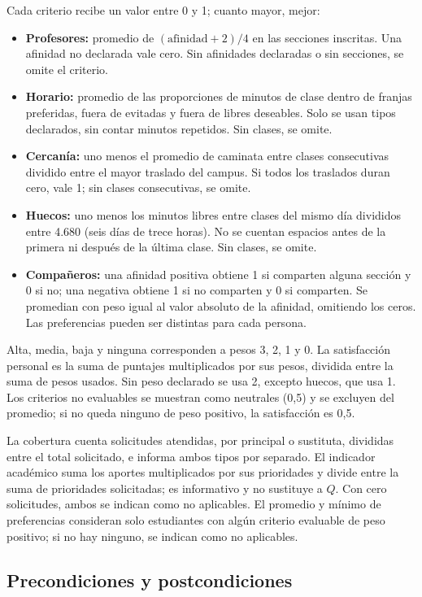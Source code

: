 Cada criterio recibe un valor entre 0 y 1; cuanto mayor, mejor:
\begin{itemize}
\item \textbf{Profesores:} promedio de $(\text{afinidad}+2)/4$ en las secciones inscritas. Una afinidad no declarada vale cero. Sin afinidades declaradas o sin secciones, se omite el criterio.
\item \textbf{Horario:} promedio de las proporciones de minutos de clase dentro de franjas preferidas, fuera de evitadas y fuera de libres deseables. Solo se usan tipos declarados, sin contar minutos repetidos. Sin clases, se omite.
\item \textbf{Cercanía:} uno menos el promedio de caminata entre clases consecutivas dividido entre el mayor traslado del campus. Si todos los traslados duran cero, vale 1; sin clases consecutivas, se omite.
\item \textbf{Huecos:} uno menos los minutos libres entre clases del mismo día divididos entre 4.680 (seis días de trece horas). No se cuentan espacios antes de la primera ni después de la última clase. Sin clases, se omite.
\item \textbf{Compañeros:} una afinidad positiva obtiene 1 si comparten alguna sección y 0 si no; una negativa obtiene 1 si no comparten y 0 si comparten. Se promedian con peso igual al valor absoluto de la afinidad, omitiendo los ceros. Las preferencias pueden ser distintas para cada persona.
\end{itemize}

Alta, media, baja y ninguna corresponden a pesos 3, 2, 1 y 0. La satisfacción personal es la suma de puntajes multiplicados por sus pesos, dividida entre la suma de pesos usados. Sin peso declarado se usa 2, excepto huecos, que usa 1. Los criterios no evaluables se muestran como neutrales (0,5) y se excluyen del promedio; si no queda ninguno de peso positivo, la satisfacción es 0,5.

La cobertura cuenta solicitudes atendidas, por principal o sustituta, divididas entre el total solicitado, e informa ambos tipos por separado. El indicador académico suma los aportes multiplicados por sus prioridades y divide entre la suma de prioridades solicitadas; es informativo y no sustituye a $Q$. Con cero solicitudes, ambos se indican como no aplicables. El promedio y mínimo de preferencias consideran solo estudiantes con algún criterio evaluable de peso positivo; si no hay ninguno, se indican como no aplicables.

\subsection{Precondiciones y postcondiciones}

